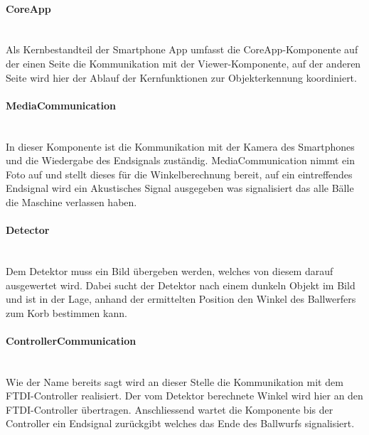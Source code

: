 		\paragraph{CoreApp}$~~$\vspace{2mm}\\
		Als Kernbestandteil der Smartphone App umfasst die CoreApp-Komponente auf der einen Seite die Kommunikation mit der Viewer-Komponente, auf der anderen Seite wird hier der Ablauf der Kernfunktionen zur Objekterkennung koordiniert.		
		
		\paragraph{MediaCommunication}$~~$\vspace{2mm}\\
		In dieser Komponente ist die Kommunikation mit der Kamera des Smartphones und die Wiedergabe des Endsignals zuständig. MediaCommunication nimmt ein Foto auf und stellt dieses für die Winkelberechnung bereit, auf ein eintreffendes Endsignal wird ein Akustisches Signal ausgegeben was signalisiert das alle Bälle die Maschine verlassen haben.
		
		\paragraph{Detector}$~~$\vspace{2mm}\\
		Dem Detektor muss ein Bild übergeben werden, welches von diesem darauf ausgewertet wird. Dabei sucht der Detektor nach einem dunkeln Objekt im Bild und ist in der Lage, anhand der ermittelten Position den Winkel des Ballwerfers zum Korb bestimmen kann.
		

		\paragraph{ControllerCommunication}$~~$\vspace{2mm}\\
		Wie der Name bereits sagt wird an dieser Stelle die Kommunikation mit dem FTDI-Controller realisiert. Der vom Detektor berechnete Winkel wird hier an den FTDI-Controller übertragen. Anschliessend wartet die Komponente bis der Controller ein Endsignal zurückgibt welches das Ende des Ballwurfs signalisiert.
		
